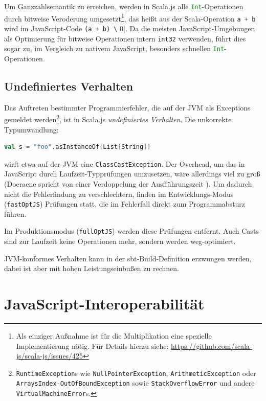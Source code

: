 \documentclass[a4paper, 12pt, hidelinks, listof=totoc, listoftables=totoc, bibliography=totoc]{scrreprt}
\newcommand{\code}[1]{\lstinline[language=Scala, style=inline]|#1|}
\newcommand{\scala}[1]{\lstinline[language=Scala, style=inline]|#1|}
\newcommand{\js}[1]{\lstinline[language=JavaScript, style=inline]|#1|}
\begin{document}
Um Ganzzahlsemantik zu erreichen, werden in Scala.js alle \scala{Int}-Operationen durch bitweise Veroderung umgesetzt\footnote{Als einziger Außnahme ist für die Multiplikation eine spezielle Implementierung nötig. Für Details hierzu siehe: \url{https://github.com/scala-js/scala-js/issues/425}}, das heißt aus der Scala-Operation \scala{a + b} wird im JavaScript-Code \js{(a + b) \| 0}. Da die meisten JavaScript-Umgebungen als Optimierung für bitweise Operationen
intern \code{int32} verwenden, führt dies sogar zu, im Vergleich zu nativem \mbox{JavaScript}, besonders schnellen \code{Int}-Operationen. \cite[Folie~16~ff., Min.~10]{doeraene2015.SSP}


\subsection{Undefiniertes Verhalten}\label{subsec:undefined-behavior}

Das Auftreten bestimmter Programmierfehler, die auf der JVM als Exceptions gemeldet werden\footnote{\scala{RuntimeException}s wie \scala{NullPointerException}, \scala{ArithmeticException} oder \scala{ArraysIndex-OutOfBoundException} sowie \scala{StackOverflowError} und andere \scala{VirtualMachineError}s.},
ist in Scala.js \emph{undefiniertes Verhalten}. Die unkorrekte Typumwandlung:

\begin{lstlisting}[language=Scala, style=snippet]
val s = "foo".asInstanceOf[List[String]]
\end{lstlisting}

wirft etwa auf der JVM eine \scala{ClassCastException}. Der Overhead, um das in JavaScript durch Laufzeit-Typprüfungen umzusetzen, wäre allerdings viel zu groß (Doeraene spricht von einer Verdoppelung der Ausfführungszeit \cite[Folie 23 ff., Min. 15]{doeraene2015.SSP}). Um dadurch nicht die Fehlerfindung zu verschlechtern, finden im Entwicklungs-Modus (\code{fastOptJS}) Prüfungen statt, die im Fehlerfall direkt zum Programmabsturz führen.

Im Produktionsmodus (\code{fullOptJS}) werden diese Prüfungen entfernt. Auch Casts sind zur Laufzeit keine Operationen mehr, sondern werden weg-optimiert.

JVM-konformes Verhalten kann in der sbt-Build-Definition erzwungen werden, dabei ist aber mit hohen Leistungseinbußen zu rechnen. \cite[Folie 23 ff., Min. 15]{doeraene2015.SSP}\cite{scalajs.DSS}



\section{JavaScript-Interoperabilität}
\end{document}
